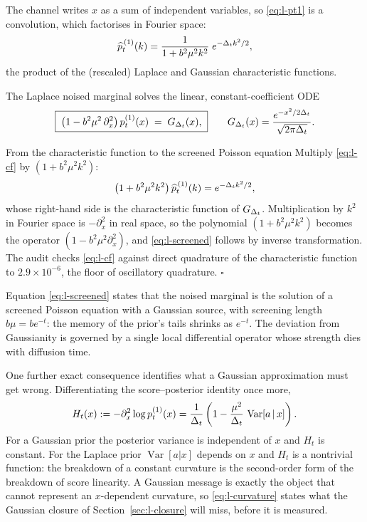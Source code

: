 The channel writes $x$ as a sum of independent variables, so
\eqref{eq:l-pt1} is a convolution, which factorises in Fourier space:
\begin{equation}
  \widehat{p}_t^{\,(1)}(k)
  = \frac{1}{1 + b^2 \mu^2 k^2}\; e^{-\Delta_t k^2/2},
  \label{eq:l-cf}
\end{equation}
the product of the (rescaled) Laplace and Gaussian characteristic
functions.

\begin{theorem}\label{thm:l-screened}
The Laplace noised marginal solves the linear, constant-coefficient ODE
\begin{equation}
  \boxed{\;
  \big( 1 - b^2 \mu^2\, \partial_x^2 \big)\, p_t^{(1)}(x)
  \;=\; G_{\Delta_t}(x),
  \;}
  \qquad
  G_{\Delta_t}(x) = \frac{e^{-x^2/2\Delta_t}}{\sqrt{2\pi \Delta_t}} .
  \label{eq:l-screened}
\end{equation}
\end{theorem}

\begin{toolbox}{From the characteristic function to the screened Poisson
equation}
Multiply \eqref{eq:l-cf} by $(1 + b^2\mu^2 k^2)$:
\begin{equation*}
  \big( 1 + b^2 \mu^2 k^2 \big)\, \widehat{p}_t^{\,(1)}(k)
  = e^{-\Delta_t k^2 / 2},
\end{equation*}
whose right-hand side is the characteristic function of $G_{\Delta_t}$.
Multiplication by $k^2$ in Fourier space is $-\partial_x^2$ in real
space, so the polynomial $(1 + b^2\mu^2 k^2)$ becomes the operator
$(1 - b^2\mu^2 \partial_x^2)$, and \eqref{eq:l-screened} follows by
inverse transformation. The audit checks \eqref{eq:l-cf} against direct
quadrature of the characteristic function to $2.9 \times 10^{-6}$, the
floor of oscillatory quadrature. \hfill$\square$
\end{toolbox}

Equation \eqref{eq:l-screened} states that the noised marginal is the
solution of a screened Poisson equation with a Gaussian source, with
screening length $b\mu = b e^{-t}$: the memory of the prior's tails
shrinks as $e^{-t}$. The deviation from Gaussianity is governed by a
single local differential operator whose strength dies with diffusion
time.

One further exact consequence identifies what a Gaussian approximation
must get wrong. Differentiating the score--posterior identity once more,
\begin{equation}
  H_t(x) := -\partial_x^2 \log p_t^{(1)}(x)
  = \frac{1}{\Delta_t}
    \left( 1 - \frac{\mu^2}{\Delta_t}\, \operatorname{Var}[a \,|\, x] \right).
  \label{eq:l-curvature}
\end{equation}
For a Gaussian prior the posterior variance is independent of $x$ and
$H_t$ is constant. For the Laplace prior $\operatorname{Var}[a|x]$ depends
on $x$ and $H_t$ is a nontrivial function: the breakdown of a constant
curvature is the second-order form of the breakdown of score linearity.
A Gaussian message is exactly the object that cannot represent an
$x$-dependent curvature, so \eqref{eq:l-curvature} states what the
Gaussian closure of Section~\ref{sec:l-closure} will miss, before it is
measured.

